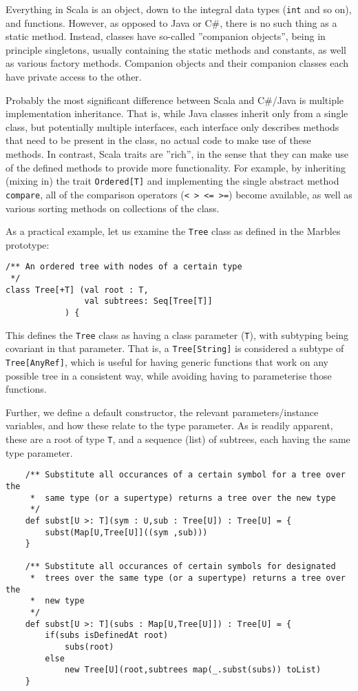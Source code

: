 Everything in Scala is an object, down to the integral data types
(\texttt{int} and so on), and functions. However, as opposed to Java or C#,
there is no such thing as a static method. Instead, classes have so-called
''companion objects'', being in principle singletons, usually containing
the static methods and constants, as well as various factory methods.
Companion objects and their companion classes each have private access to
the other.

Probably the most significant difference between Scala and C#/Java is
multiple implementation inheritance. That is, while Java classes inherit
only from a single class, but potentially multiple interfaces, each
interface only describes methods that need to be present in the class, no
actual code to make use of these methods. In contrast, Scala traits are
''rich'', in the sense that they can make use of the defined methods to
provide more functionality. For example, by inheriting (mixing in) the
trait \texttt{Ordered[T]} and implementing the single abstract method
\texttt{compare}, all of the comparison operators (\texttt{< > <= >=})
become available, as well as various sorting methods on collections of the
class.

As a practical example, let us examine the \texttt{Tree} class as defined
in the Marbles prototype:

\begin{verbatim}
/** An ordered tree with nodes of a certain type
 */
class Tree[+T] (val root : T, 
		        val subtrees: Seq[Tree[T]]
			) { 
\end{verbatim}

This defines the \texttt{Tree} class as having a class parameter
(\texttt{T}), with subtyping being covariant in that parameter. That is, a
\texttt{Tree[String]} is considered a subtype of \texttt{Tree[AnyRef]},
which is useful for having generic functions that work on any possible tree
in a consistent way, while avoiding having to parameterise those functions.

Further, we define a default constructor, the relevant parameters/instance
variables, and how these relate to the type parameter. As is readily
apparent, these are a root of type \texttt{T}, and a sequence (list) of
subtrees, each having the same type parameter.

\begin{verbatim}
	/** Substitute all occurances of a certain symbol for a tree over the
	 *  same type (or a supertype) returns a tree over the new type
	 */
	def subst[U >: T](sym : U,sub : Tree[U]) : Tree[U] = {
		subst(Map[U,Tree[U]]((sym ,sub)))
	}

	/** Substitute all occurances of certain symbols for designated 
	 *  trees over the same type (or a supertype) returns a tree over the
	 *  new type
	 */
	def subst[U >: T](subs : Map[U,Tree[U]]) : Tree[U] = {
		if(subs isDefinedAt root)
			subs(root)
		else
			new Tree[U](root,subtrees map(_.subst(subs)) toList)
	}
\end{verbatim}

